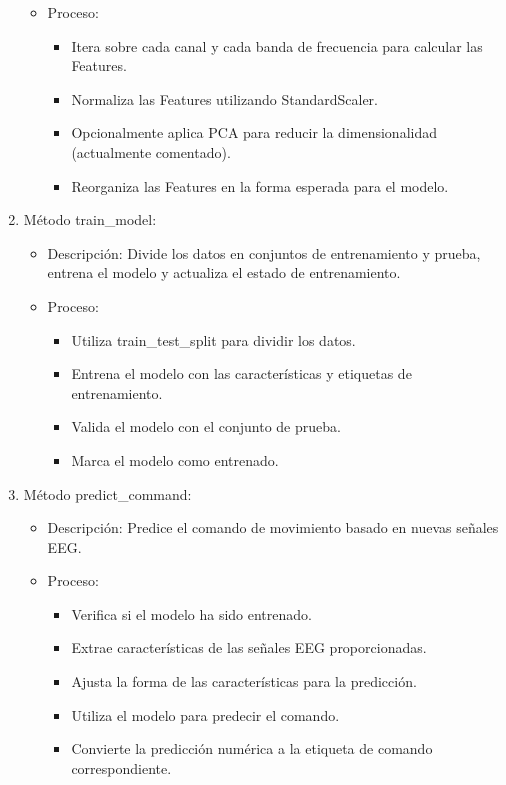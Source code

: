 \documentclass{article}
\begin{document}
\begin{enumerate}
\begin{itemize}
\begin{itemize}
        \end{itemize}
        \item Proceso:
        \begin{itemize}
            \item Itera sobre cada canal y cada banda de frecuencia para calcular las Features.
            \item Normaliza las Features utilizando StandardScaler.
            \item Opcionalmente aplica PCA para reducir la dimensionalidad (actualmente comentado).
            \item Reorganiza las Features en la forma esperada para el modelo.
        \end{itemize}
    \end{itemize}
    \item Método train\_model:
    \begin{itemize}
        \item Descripción: Divide los datos en conjuntos de entrenamiento y prueba, entrena el modelo y actualiza el estado de entrenamiento.
        \item Proceso:
        \begin{itemize}
            \item Utiliza train\_test\_split para dividir los datos.
            \item Entrena el modelo con las características y etiquetas de entrenamiento.
            \item Valida el modelo con el conjunto de prueba.
            \item Marca el modelo como entrenado.
        \end{itemize}
    \end{itemize}
    \item Método predict\_command:
    \begin{itemize}
        \item Descripción: Predice el comando de movimiento basado en nuevas señales EEG.
        \newpage
        \item Proceso:
        \begin{itemize}
            \item Verifica si el modelo ha sido entrenado.
            \item Extrae características de las señales EEG proporcionadas.
            \item Ajusta la forma de las características para la predicción.
            \item Utiliza el modelo para predecir el comando.
            \item Convierte la predicción numérica a la etiqueta de comando correspondiente.
        \end{itemize}
    \end{itemize}
\end{enumerate}
\end{document}
